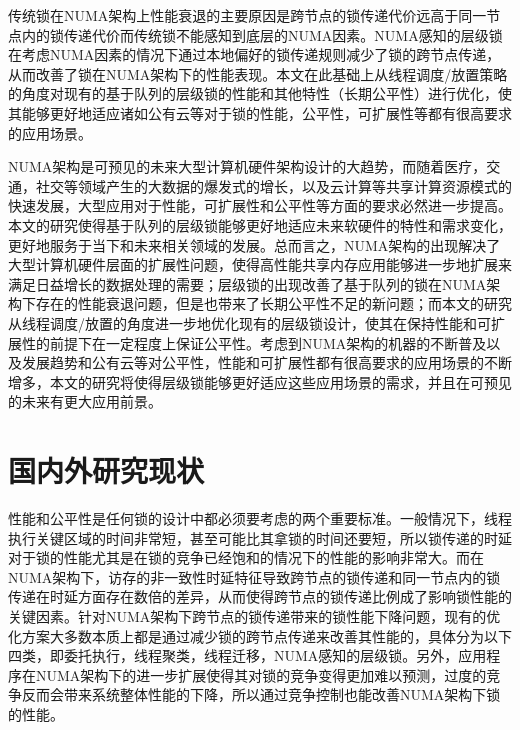 传统锁在NUMA架构上性能衰退的主要原因是跨节点的锁传递代价远高于同一节点内的锁传递代价而传统锁不能感知到底层的NUMA因素。NUMA感知的层级锁在考虑NUMA因素的情况下通过本地偏好的锁传递规则减少了锁的跨节点传递，从而改善了锁在NUMA架构下的性能表现。本文在此基础上从线程调度/放置策略的角度对现有的基于队列的层级锁的性能和其他特性（长期公平性）进行优化，使其能够更好地适应诸如公有云等对于锁的性能，公平性，可扩展性等都有很高要求的应用场景。

NUMA架构是可预见的未来大型计算机硬件架构设计的大趋势，而随着医疗，交通，社交等领域产生的大数据的爆发式的增长，以及云计算等共享计算资源模式的快速发展，大型应用对于性能，可扩展性和公平性等方面的要求必然进一步提高。本文的研究使得基于队列的层级锁能够更好地适应未来软硬件的特性和需求变化，更好地服务于当下和未来相关领域的发展。总而言之，NUMA架构的出现解决了大型计算机硬件层面的扩展性问题，使得高性能共享内存应用能够进一步地扩展来满足日益增长的数据处理的需要；层级锁的出现改善了基于队列的锁在NUMA架构下存在的性能衰退问题，但是也带来了长期公平性不足的新问题；而本文的研究从线程调度/放置的角度进一步地优化现有的层级锁设计，使其在保持性能和可扩展性的前提下在一定程度上保证公平性。考虑到NUMA架构的机器的不断普及以及发展趋势和公有云等对公平性，性能和可扩展性都有很高要求的应用场景的不断增多，本文的研究将使得层级锁能够更好适应这些应用场景的需求，并且在可预见的未来有更大应用前景。
\section{国内外研究现状}
性能和公平性是任何锁的设计中都必须要考虑的两个重要标准\cite{chabbi2015high}。一般情况下，线程执行关键区域的时间非常短，甚至可能比其拿锁的时间还要短\cite{johnson2010decoupling}，所以锁传递的时延对于锁的性能尤其是在锁的竞争已经饱和的情况下的性能的影响非常大。而在NUMA架构下，访存的非一致性时延特征导致跨节点的锁传递和同一节点内的锁传递在时延方面存在数倍的差异，从而使得跨节点的锁传递比例成了影响锁性能的关键因素。针对NUMA架构下跨节点的锁传递带来的锁性能下降问题，现有的优化方案大多数本质上都是通过减少锁的跨节点传递来改善其性能的，具体分为以下四类，即委托执行，线程聚类，线程迁移，NUMA感知的层级锁。另外，应用程序在NUMA架构下的进一步扩展使得其对锁的竞争变得更加难以预测，过度的竞争反而会带来系统整体性能的下降，所以通过竞争控制也能改善NUMA架构下锁的性能。

